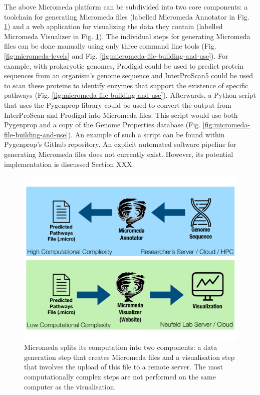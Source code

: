 The above Micromeda platform can be subdivided into two core components: a toolchain for generating Micromeda files (labelled Micromeda Annotator in Fig. \ref{fig:micromeda-file-generation}) and a web application for visualizing the data they contain (labelled Micromeda Visualizer in Fig. \ref{fig:micromeda-file-generation}). The individual steps for generating Micromeda files can be done manually using only three command line tools (Fig. \ref{fig:micromeda-levels} and Fig. \ref{fig:micromeda-file-building-and-use}). For example, with prokaryotic genomes, Prodigal could be used to predict protein sequences from an organism's genome sequence and InterProScan5 could be used to scan these proteins to identify enzymes that support the existence of specific pathways (Fig. \ref{fig:micromeda-file-building-and-use}). Afterwards, a Python script that uses the Pygenprop library could be used to convert the output from InterProScan and Prodigal into Micromeda files. This script would use both Pygenprop and a copy of the Genome Properties database (Fig. \ref{fig:micromeda-file-building-and-use}). An example of such a script can be found within Pygenprop's Github repository. An explicit automated software pipeline for generating Micromeda files does not currently exist. However, its potential implementation is discussed Section XXX.

\begin{figure}[!ht]
  \centering
	\includegraphics[width=\textwidth]{media/micromeda-file-generation.pdf}
	 \caption{Micromeda splits its computation into two components: a data generation step that creates Micromeda files and a visualisation step that involves the upload of this file to a remote server. The most computationally complex steps are not performed on the same computer as the visualisation.}
	 \label{fig:micromeda-file-generation}
\end{figure}

